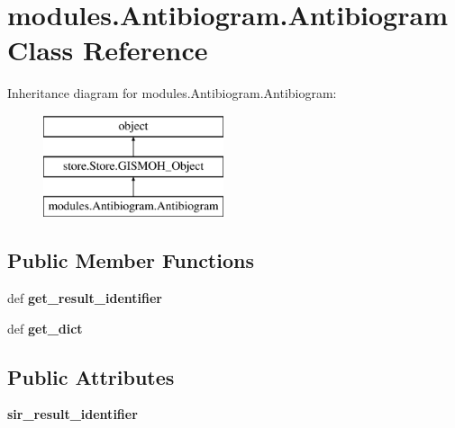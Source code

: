 \hypertarget{classmodules_1_1_antibiogram_1_1_antibiogram}{\section{modules.\-Antibiogram.\-Antibiogram Class Reference}
\label{classmodules_1_1_antibiogram_1_1_antibiogram}
}
Inheritance diagram for modules.\-Antibiogram.\-Antibiogram\-:\begin{figure}[H]
\begin{center}
\leavevmode
\includegraphics[height=3.000000cm]{classmodules_1_1_antibiogram_1_1_antibiogram}
\end{center}
\end{figure}
\subsection*{Public Member Functions}
\begin{DoxyCompactItemize}
\item 
\hypertarget{classmodules_1_1_antibiogram_1_1_antibiogram_a94f7e88577ef3c810f5b80ed1ac69597}{def {\bfseries get\-\_\-result\-\_\-identifier}}\label{classmodules_1_1_antibiogram_1_1_antibiogram_a94f7e88577ef3c810f5b80ed1ac69597}

\item 
\hypertarget{classmodules_1_1_antibiogram_1_1_antibiogram_ad6cf942a165a54a3030c910c4a14fb31}{def {\bfseries get\-\_\-dict}}\label{classmodules_1_1_antibiogram_1_1_antibiogram_ad6cf942a165a54a3030c910c4a14fb31}

\end{DoxyCompactItemize}
\subsection*{Public Attributes}
\begin{DoxyCompactItemize}
\item 
\hypertarget{classmodules_1_1_antibiogram_1_1_antibiogram_ac5aeccaeb90a0643297e4d28dc51450f}{{\bfseries sir\-\_\-result\-\_\-identifier}}\label{classmodules_1_1_antibiogram_1_1_antibiogram_ac5aeccaeb90a0643297e4d28dc51450f}

\end{DoxyCompactItemize}
